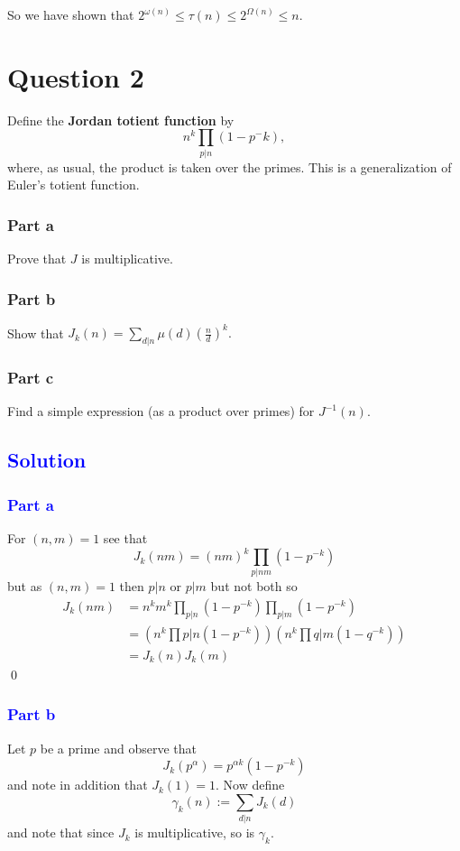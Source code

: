\documentclass{unswmaths}
\begin{document}
So we have shown that $ 2^{\omega(n)} \leq \tau(n) \leq 2^{\Omega(n)} \leq n $.

\hrulefill

\section*{Question 2}
Define the \textbf{Jordan totient function} by 
$$
    n^k\prod_{p|n}(1-p^-k),
$$
where, as usual, the product is taken over the primes. This is a generalization of Euler's
totient function.
\subsubsection*{Part a}
Prove that $ J $ is multiplicative.
\subsubsection*{Part b}
Show that $ J_k(n) = \sum_{d|n} \mu(d) (\frac{n}{d})^k. $
\subsubsection*{Part c}
Find a simple expression (as a product over primes) for $ J^{-1}(n) $.

\hrulefill
\subsection*{\textcolor{blue}{Solution}}
\subsubsection*{\textcolor{blue}{Part a}}
For $ (n,m) = 1 $ see that
$$
    J_k(nm) = (nm)^k \prod_{p|nm} (1-p^{-k})
$$
but as $ (n,m) = 1 $ then $ p | n $ or $ p | m $ but not both so
\begin{align*}
    J_k(nm) &= n^k m^k \prod_{p|n} (1-p^{-k})\prod_{p|m} (1-p^{-k}) \\
        &= \left( n^k \prod{p|n}(1-p^{-k}) \right)\left( n^k \prod{q|m}(1-q^{-k}) \right) \\
        &= J_k(n) J_k(m)
\end{align*}
\qed

\subsubsection*{\textcolor{blue}{Part b}}
Let $ p $ be a prime and observe that
$$
    J_k(p^\alpha) = p^{\alpha k }(1- p^{-k})
$$
and note in addition that $ J_k(1) = 1 $.
Now define 
$$
    \gamma_k(n) := \sum_{d|n} J_k(d) 
$$
and note that since $ J_k $ is multiplicative, so is $ \gamma_k $.
\end{document}
